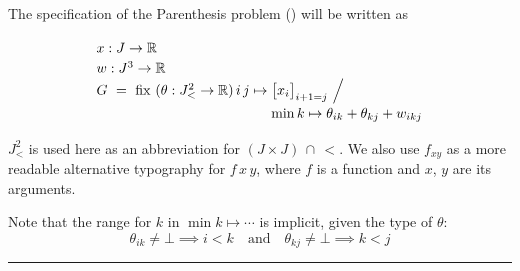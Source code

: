 \exampleTitle  \begin{comment}\subsection{Example}\end{comment}

\noindent
The specification of the Parenthesis problem () will be written as

\vspace{-5mm}
\[
  \renewcommand\arraystretch{1.2}
  \begin{array}{@{}l@{}l@{}l@{}}
    \lspan2{x : J \to \R} \\
    \lspan2{w : J^3 \to \R} \\
    G ~=~ \fix~(\theta:J^2_<\to\R)\,i\,j \mapsto{}
      & \big[x_i\big]_{i+1=j} ~\Big/ \\
      & \min k\mapsto\theta_{ik}+\theta_{kj}+w_{ikj}
  \end{array}
\]

$J^2_{<}$ is used here as an abbreviation for $(J{\times}J)\,{\cap}\,{<}$.
We also use $f_{xy}$
as a more readable alternative typography for $f\,x\,y$,
where $f$ is a function and $x$, $y$ are its arguments.

Note that the range for $k$ in $\min k\mapsto\cdots$ is implicit, given the type of
$\theta$: 
\[\theta_{ik}\neq\bot\implies i<k \quad \mbox{and} \quad \theta_{kj}\neq\bot\implies k<j\]

\hrule
